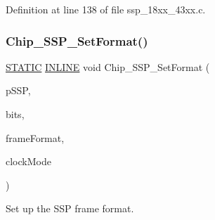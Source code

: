 Definition at line 138 of file ssp\+\_\+18xx\+\_\+43xx.\+c.

\mbox{\label{group___s_s_p__18_x_x__43_x_x_ga381ba3a6b470b2c84468b88deed8ac18}} 
\subsubsection{\texorpdfstring{Chip\+\_\+\+S\+S\+P\+\_\+\+Set\+Format()}{Chip\_SSP\_SetFormat()}}
{\footnotesize\ttfamily \hyperlink{group___l_p_c___types___public___macros_ga10b2d890d871e1489bb02b7e70d9bdfb}{S\+T\+A\+T\+IC} \hyperlink{spifi__18xx__43xx_8h_a2eb6f9e0395b47b8d5e3eeae4fe0c116}{I\+N\+L\+I\+NE} void Chip\+\_\+\+S\+S\+P\+\_\+\+Set\+Format (\begin{DoxyParamCaption}\item[{\hyperlink{struct_l_p_c___s_s_p___t}{L\+P\+C\+\_\+\+S\+S\+P\+\_\+T} $\ast$}]{p\+S\+SP,  }\item[{uint32\+\_\+t}]{bits,  }\item[{uint32\+\_\+t}]{frame\+Format,  }\item[{uint32\+\_\+t}]{clock\+Mode }\end{DoxyParamCaption})}



Set up the S\+SP frame format. 


